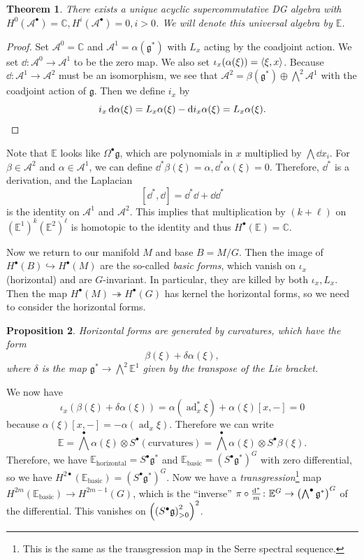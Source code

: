 \documentclass[leqno, openany]{memoir}
\newtheorem{thm}{Theorem}[section]
\newtheorem{prop}[thm]{Proposition}
\theoremstyle{definition}
\theoremstyle{remark}
\theoremstyle{plain}
\theoremstyle{definition}
\theoremstyle{remark}
\newcommand{\C}{\mathbb{C}}
\newcommand{\E}{\mathbb{E}}
\newcommand{\mf}[1]{\mathfrak{#1}}
\newcommand{\msc}[1]{\mathscr{#1}}
\DeclareMathOperator{\ad}{ad}
\begin{document}
\begin{thm}
    There exists a unique acyclic supercommutative DG algebra with $H^0(\msc{A}^{\bullet}) = \C, H^i(\msc{A}^{\bullet}) = 0, i > 0$. We will denote this universal algebra by $\mathbb{E}$.
\end{thm}

\begin{proof}
    Set $\msc{A}^0 = \C$ and $\msc{A}^1 = \alpha(\mf{g}^*)$ with $L_x$ acting by the coadjoint action. We set $\dd \colon \msc{A}^0 \to \msc{A}^1$ to be the zero map. We also set $\iota_x(\alpha(\xi)) = \ev{\xi, x}$. Because $\dd \colon \msc{A}^1 \to \msc{A}^2$ must be an isomorphism, we see that $\msc{A}^2 = \beta(\mf{g}^*) \oplus \bigwedge^2 \msc{A}^1$ with the coadjoint action of $\mf{g}$. Then we define $i_x$ by
    \[ i_x \dd{\alpha(\xi)} = L_x \alpha(\xi) - \dd i_x \alpha(\xi) = L_x \alpha(\xi). \qedhere \]
\end{proof}

Note that $\E$ looks like $\Omega^{\bullet} \mf{g}$, which are polynomials in $x$ multiplied by $\bigwedge \dd{x_i}$. For $\beta \in \msc{A}^2$ and $\alpha \in \msc{A}^1$, we can define $\dd^*{\beta}(\xi) = \alpha, \dd^* \alpha(\xi) = 0$. Therefore, $\dd^*$ is a derivation, and the Laplacian
\[ [\dd^*, \dd] = \dd^* \dd + \dd \dd^* \]
is the identity on $\msc{A}^1$ and $\msc{A}^2$. This implies that multiplication by $(k+\ell)$ on ${(\E^1)}^k {(\E^2)}^{\ell}$ is homotopic to the identity and thus $H^{\bullet}(\E) = \C$.

Now we return to our manifold $M$ and base $B = M/G$. Then the image of $H^{\bullet}(B) \hookrightarrow H^{\bullet}(M)$ are the so-called \textit{basic forms}, which vanish on $\iota_x$ (horizontal) and are $G$-invariant. In particular, they are killed by both $\iota_x, L_x$. Then the map $H^{\bullet}(M) \twoheadrightarrow H^{\bullet}(G)$ has kernel the horizontal forms, so we need to consider the horizontal forms.

\begin{prop}
    Horizontal forms are generated by \textit{curvatures}, which have the form 
    \[ \beta(\xi) + \delta \alpha(\xi), \]
    where $\delta$ is the map $\mf{g}^* \to \bigwedge^2 \E^1$ given by the transpose of the Lie bracket. 
\end{prop}

We now have
\[ \iota_x (\beta(\xi) + \delta \alpha(\xi)) = \alpha(\ad_x^* \xi) + \alpha(\xi) [x,-] = 0 \]
because $\alpha(\xi)[x,-] = -\alpha(\ad_x \xi)$. Therefore we can write
\[ \E = {\bigwedge}^{\bullet} \alpha(\xi) \otimes S^{\bullet}(\text{curvatures}) = {\bigwedge}^{\bullet} \alpha(\xi) \otimes S^{\bullet} \beta(\xi). \]
Therefore, we have $\E_{\text{horizontal}} = S^{\bullet} \mf{g}^*$ and $\E_{\text{basic}} = {(S^{\bullet} \mf{g}^*)}^G$ with zero differential, so we have $H^{2 \bullet}(\E_{\text{basic}}) = {(S^{\bullet} \mf{g}^*)}^G$. Now we have a \textit{transgression}\footnote{This is the same as the transgression map in the Serre spectral sequence.} map $H^{2 m}(\E_{\text{basic}}) \to H^{2 m-1}(G)$, which is the ``inverse'' $\pi \circ \frac{\dd^*}{m} \colon \E^G \to { \qty( \bigwedge^{\bullet} \mf{g}^* ) }^G$ of the differential. This vanishes on ${ \qty( { ( S^{\bullet} \mf{g} ) }^2_{>0} ) }^2$.
\end{document}
